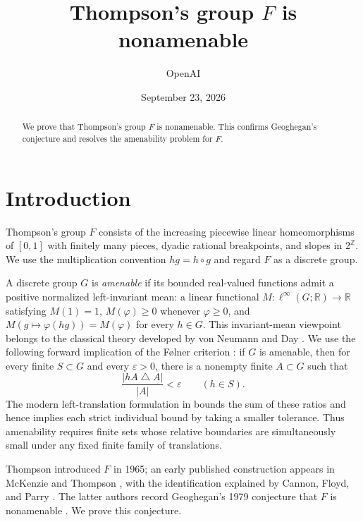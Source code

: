 \documentclass[11pt]{article}
\title{Thompson's group \(F\) is nonamenable}
\author{OpenAI}
\date{September 23, 2026}
\newcommand{\R}{\mathbb R}
\newcommand{\Z}{\mathbb Z}
\theoremstyle{definition}
\numberwithin{equation}{section}
\begin{document}
\maketitle
\begin{abstract}
We prove that Thompson's group \(F\) is nonamenable. This confirms
Geoghegan's conjecture and resolves the amenability problem for \(F\).
\end{abstract}

\section{Introduction}
\label{sec:introduction}

Thompson's group \(F\) consists of the increasing piecewise linear
homeomorphisms of \([0,1]\) with finitely many pieces, dyadic rational
breakpoints, and slopes in \(2^{\Z}\). We use the multiplication convention
\(hg=h\circ g\) and regard \(F\) as a discrete group.

A discrete group \(G\) is \emph{amenable} if its bounded real-valued
functions admit a positive normalized left-invariant mean: a linear
functional \(M:\ell^\infty(G;\R)\to\R\) satisfying \(M(1)=1\),
\(M(\varphi)\ge0\) whenever \(\varphi\ge0\), and
\(M(g\mapsto\varphi(hg))=M(\varphi)\) for every \(h\in G\).
This invariant-mean viewpoint belongs to the classical theory developed
by von Neumann and Day \cite{vonNeumann1929,Day1957}.
We use the following forward implication of the F\o lner criterion
\cite{Folner1955}: if \(G\) is amenable, then for every finite
\(S\subset G\) and every \(\varepsilon>0\), there is a nonempty finite
\(A\subset G\) such that
\begin{equation}\label{eq:folner}
  \frac{|hA\mathbin{\triangle}A|}{|A|}<\varepsilon
  \qquad(h\in S).
\end{equation}
The modern left-translation formulation in
\cite[Theorem~1.2]{Moore2013} bounds the sum of these ratios and hence
implies each strict individual bound by taking a smaller tolerance.
Thus amenability requires finite sets
whose relative boundaries are simultaneously small under any fixed
finite family of translations.

Thompson introduced \(F\) in 1965; an early published construction appears
in McKenzie and Thompson \cite{McKenzieThompson1973}, with the identification
explained by Cannon, Floyd, and Parry \cite[pp.~215--216]{CannonFloydParry1996}.
The latter authors record Geoghegan's 1979 conjecture that \(F\) is
nonamenable \cite[p.~227]{CannonFloydParry1996}. We prove this conjecture.
\end{document}
